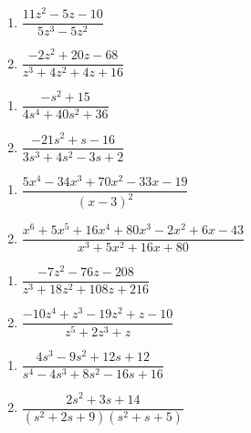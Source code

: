 \begin{multicols}{2}
\begin{enumerate}
\setcounter{enumi}{\value{HW}}

\item $\dfrac{11z^{2} - 5z - 10}{5z^{3} - 5z^{2}}$
\item $\dfrac{-2z^{2} + 20z - 68}{z^{3} + 4z^{2} + 4z + 16}$

\setcounter{HW}{\value{enumi}}
\end{enumerate}
\end{multicols}

\begin{multicols}{2}
\begin{enumerate}
\setcounter{enumi}{\value{HW}}

\item $\dfrac{-s^{2} + 15}{4s^{4} + 40s^{2} + 36}$
\item $\dfrac{-21s^{2} + s - 16}{3s^{3} + 4s^{2} - 3s + 2}$


\setcounter{HW}{\value{enumi}}
\end{enumerate}
\end{multicols}

\begin{multicols}{2}
\begin{enumerate}
\setcounter{enumi}{\value{HW}}

\item $\dfrac{5x^{4} - 34x^{3} + 70x^{2} - 33x - 19}{(x - 3)^{2}}$
\item $\dfrac{x^{6} + 5x^{5} + 16x^{4} + 80x^{3} - 2x^{2} + 6x - 43}{x^{3} + 5x^{2} + 16x + 80}$


\setcounter{HW}{\value{enumi}}
\end{enumerate}
\end{multicols}

\begin{multicols}{2}
\begin{enumerate}
\setcounter{enumi}{\value{HW}}

\item $\dfrac{-7z^{2} - 76z - 208}{z^{3} + 18z^{2} + 108z + 216}$
\item $\dfrac{-10z^{4} + z^{3} - 19z^{2} + z - 10}{z^{5} + 2z^{3} + z}$


\setcounter{HW}{\value{enumi}}
\end{enumerate}
\end{multicols}

\begin{multicols}{2}
\begin{enumerate}
\setcounter{enumi}{\value{HW}}

\item $\dfrac{4s^{3} - 9s^{2} + 12s + 12}{s^{4} - 4s^{3} + 8s^{2} - 16s + 16}$
\item $\dfrac{2s^{2} + 3s + 14}{(s^{2} + 2s + 9)(s^{2} + s + 5)}$ \label{findparfraclast}

\setcounter{HW}{\value{enumi}}
\end{enumerate}
\end{multicols}

